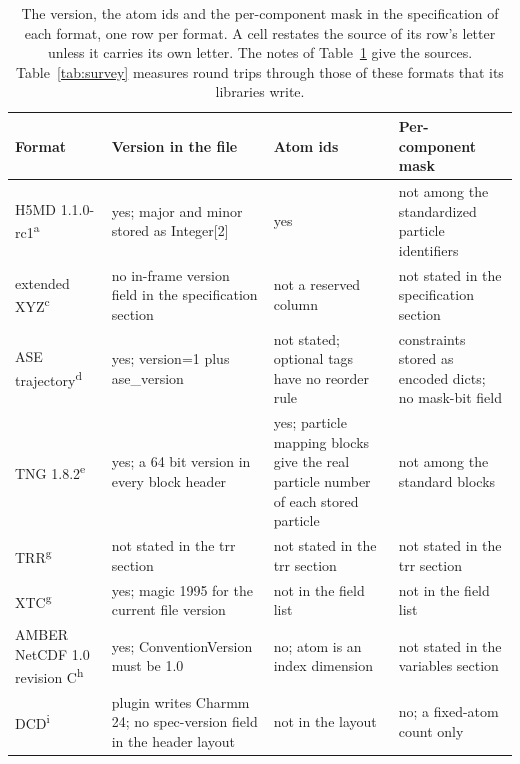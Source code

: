 \begin{table}[tbp]
\centering
\scriptsize
\caption{The version, the atom ids and the per-component mask in the specification of each format, one row per format.
A cell restates the source of its row's letter unless it carries its own letter.
The notes of Table~\ref{tab:spec-compare} give the sources.
Table~\ref{tab:survey} measures round trips through those of these formats that its libraries write.}
\label{tab:spec-compare}
\setlength{\tabcolsep}{3pt}
\begin{tabular}{@{}p{}p{}p{}p{}@{}}
\toprule
\raggedright Format & \raggedright Version in the file & \raggedright Atom ids & \raggedright Per-component mask \tabularnewline
\midrule
\raggedright H5MD 1.1.0-rc1\textsuperscript{a} & \raggedright yes; major and minor stored as Integer[2] & \raggedright yes & \raggedright not among the standardized particle identifiers \tabularnewline
\raggedright extended XYZ\textsuperscript{c} & \raggedright no in-frame version field in the specification section & \raggedright not a reserved column & \raggedright not stated in the specification section \tabularnewline
\raggedright ASE trajectory\textsuperscript{d} & \raggedright yes; version=1 plus ase\_version & \raggedright not stated; optional tags have no reorder rule & \raggedright constraints stored as encoded dicts; no mask-bit field \tabularnewline
\raggedright TNG 1.8.2\textsuperscript{e} & \raggedright yes; a 64 bit version in every block header & \raggedright yes; particle mapping blocks give the real particle number of each stored particle & \raggedright not among the standard blocks \tabularnewline
\raggedright TRR\textsuperscript{g} & \raggedright not stated in the trr section & \raggedright not stated in the trr section & \raggedright not stated in the trr section \tabularnewline
\raggedright XTC\textsuperscript{g} & \raggedright yes; magic 1995 for the current file version & \raggedright not in the field list & \raggedright not in the field list \tabularnewline
\raggedright AMBER NetCDF 1.0 revision C\textsuperscript{h} & \raggedright yes; ConventionVersion must be 1.0 & \raggedright no; atom is an index dimension & \raggedright not stated in the variables section \tabularnewline
\raggedright DCD\textsuperscript{i} & \raggedright plugin writes Charmm 24; no spec-version field in the header layout & \raggedright not in the layout & \raggedright no; a fixed-atom count only \tabularnewline

\end{tabular}
\end{table}
